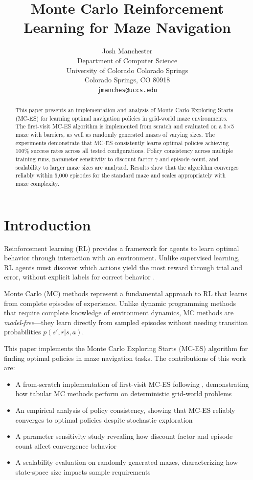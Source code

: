 \documentclass[letterpaper]{article}
\title{Monte Carlo Reinforcement Learning for Maze Navigation}
\author{
    Josh Manchester\\
    Department of Computer Science\\
    University of Colorado Colorado Springs\\
    Colorado Springs, CO 80918\\
    \texttt{jmanches@uccs.edu}
}
\begin{document}
\maketitle

\begin{abstract}
This paper presents an implementation and analysis of Monte Carlo Exploring Starts (MC-ES) for learning optimal navigation policies in grid-world maze environments. The first-visit MC-ES algorithm is implemented from scratch and evaluated on a 5$\times$5 maze with barriers, as well as randomly generated mazes of varying sizes. The experiments demonstrate that MC-ES consistently learns optimal policies achieving 100\% success rates across all tested configurations. Policy consistency across multiple training runs, parameter sensitivity to discount factor $\gamma$ and episode count, and scalability to larger maze sizes are analyzed. Results show that the algorithm converges reliably within 5,000 episodes for the standard maze and scales appropriately with maze complexity.
\end{abstract}

\section{Introduction}

Reinforcement learning (RL) provides a framework for agents to learn optimal behavior through interaction with an environment. Unlike supervised learning, RL agents must discover which actions yield the most reward through trial and error, without explicit labels for correct behavior \citep{sutton2018reinforcement}.

Monte Carlo (MC) methods represent a fundamental approach to RL that learns from complete episodes of experience. Unlike dynamic programming methods that require complete knowledge of environment dynamics, MC methods are \textit{model-free}---they learn directly from sampled episodes without needing transition probabilities $p(s', r | s, a)$.

This paper implements the Monte Carlo Exploring Starts (MC-ES) algorithm for finding optimal policies in maze navigation tasks. The contributions of this work are:

\begin{itemize}
    \item A from-scratch implementation of first-visit MC-ES following \citet{sutton2018reinforcement}, demonstrating how tabular MC methods perform on deterministic grid-world problems
    \item An empirical analysis of policy consistency, showing that MC-ES reliably converges to optimal policies despite stochastic exploration
    \item A parameter sensitivity study revealing how discount factor and episode count affect convergence behavior
    \item A scalability evaluation on randomly generated mazes, characterizing how state-space size impacts sample requirements
\end{itemize}
\end{document}
